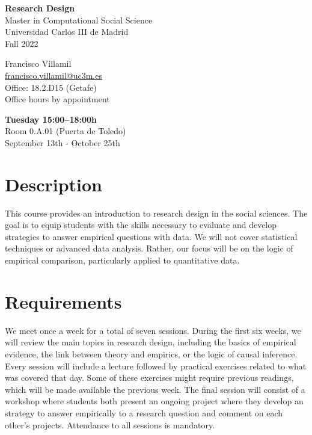 \documentclass[12pt, a4paper]{article}
\begin{document}
\begin{center}
{\LARGE\bf Research Design}\\\vspace{10pt}
Master in Computational Social Science\\
Universidad Carlos III de Madrid\\\vspace{10pt}
{\large Fall 2022}\\
\end{center}

\vspace{20pt}

\begin{minipage}{0.49\textwidth}
\centering
Francisco Villamil\\
\href{francisco.villamil@uc3m.es}{francisco.villamil@uc3m.es}\\
Office: 18.2.D15 (Getafe)\\
Office hours by appointment
\end{minipage}\hfill
\begin{minipage}{0.49\textwidth}
\centering
\textbf{Tuesday 15:00--18:00h}\\Room 0.A.01 (Puerta de Toledo)\\September 13th - October 25th\\
\end{minipage}


\vspace{10pt}
\section{Description}

This course provides an introduction to research design in the social sciences.
The goal is to equip students with the skills necessary to evaluate and develop strategies to answer empirical questions with data.
We will not cover statistical techniques or advanced data analysis.
Rather, our focus will be on the logic of empirical comparison, particularly applied to quantitative data.

\section{Requirements}

We meet once a week for a total of seven sessions. During the first six weeks, we will review the main topics in research design, including the basics of empirical evidence, the link between theory and empirics, or the logic of causal inference. Every session will include a lecture followed by practical exercises related to what was covered that day. Some of these exercises might require previous readings, which will be made available the previous week. The final session will consist of a workshop where students both present an ongoing project where they develop an strategy to answer empirically to a research question and comment on each other's projects. Attendance to all sessions is mandatory.
\end{document}
